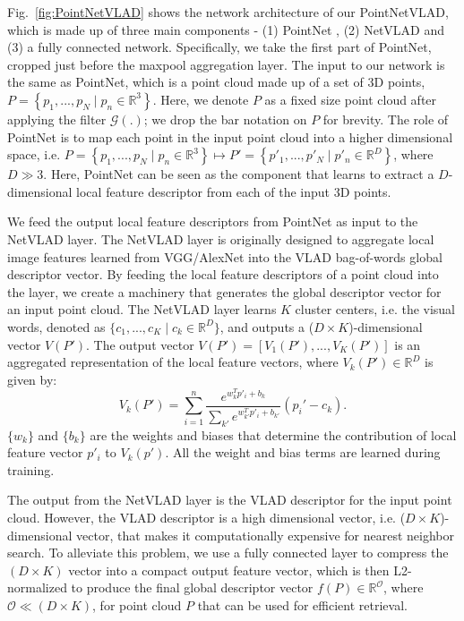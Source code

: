 \documentclass[10pt,twocolumn,letterpaper]{article}
\begin{document}
Fig.~\ref{fig:PointNetVLAD} shows the network architecture of our PointNetVLAD, which is made up of three main components - (1) PointNet \cite{qi2016pointnet}, (2) NetVLAD \cite{Arandjelovic16} and (3) a fully connected network. Specifically, we take the first part of PointNet, cropped just before the maxpool aggregation layer. The input to our network is the same as PointNet, which is a point cloud made up of a set of 3D points, $P = \left\lbrace p_1, ..., p_N \mid p_n \in \mathbb{R}^3 \right\rbrace$. Here, we denote $P$ as a fixed size point cloud after applying the filter $\mathcal{G}(.)$; we drop the bar notation on $P$ for brevity.
The role of PointNet is to map each point in the input point cloud into a higher dimensional space, i.e. $P = \left\lbrace p_1, ..., p_N \mid p_n \in \mathbb{R}^3 \right\rbrace \longmapsto P' = \left\lbrace p'_1, ..., p'_N \mid p'_n \in \mathbb{R}^D\right\rbrace$, where $D \gg 3$. Here, PointNet can be seen as the component that learns to extract a $D$-dimensional local feature descriptor from each of the input 3D points.

We feed the output local feature descriptors from PointNet as input to the NetVLAD layer. The NetVLAD layer is originally designed to aggregate local image features learned from VGG/AlexNet into the VLAD bag-of-words global descriptor vector. By feeding the local feature descriptors of a point cloud into the layer, we create a machinery that generates the global descriptor vector for an input point cloud. The NetVLAD layer learns $K$ cluster centers, i.e. the visual words, denoted as $\{c_1, ..., c_K \mid c_k\in\mathbb{R}^{D}\}$, and outputs a ($D \times K$)-dimensional vector $V(P')$. The output vector $V(P') = [V_1(P'), ..., V_K(P')]$ is an aggregated representation of the local feature vectors, where $V_k(P') \in \mathbb{R}^D$ is given by:
\begin{equation}\label{eq:NetVLAD}
V_{k}(P')=\sum_{i=1}^{n}{\frac{e^{w_k^{T}p'_i+b_k}}{\sum_{k'}e^{w_{k'}^{T}p'_i+b_{k'}}}(p_i'-c_k)}.
\end{equation}
\noindent $\{w_k\}$ and $\{b_k\}$ are the weights and biases that determine the contribution of local feature vector $p'_i$ to $V_k(p')$. All the weight and bias terms are learned during training.

The output from the NetVLAD layer is the VLAD descriptor \cite{conf/cvpr/JegouDSP10,Arandjelovic:2013} for the input point cloud. However, the VLAD descriptor is a high dimensional vector, i.e. ($D \times K$)-dimensional vector, that makes it computationally expensive for nearest neighbor search. To alleviate this problem, 
we use a fully connected layer to compress the $(D \times K)$ vector into a compact output feature vector, which is then L2-normalized to produce the final global descriptor vector $f(P) \in \mathbb{R}^{\mathcal{O}}$, where $\mathcal{O} \ll (D \times K)$,  for point cloud $P$ that can be used for efficient retrieval. 
\end{document}
